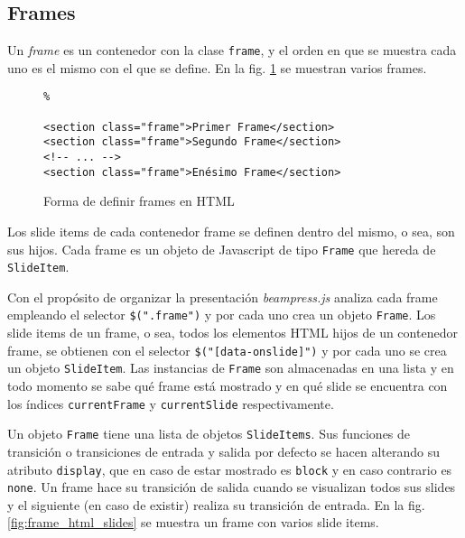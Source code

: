
		\subsection{Frames} %
		 \label{sub:frames}
		 
		  
			Un \textit{frame} es un contenedor con la clase \texttt{frame}, y el orden en que se muestra cada uno es el mismo con el que se define. En la fig. \ref{fig:frames_html} se muestran varios frames.


				\begin{figure}[htb]%
					\begin{lstlisting}%

<section class="frame">Primer Frame</section>
<section class="frame">Segundo Frame</section>
<!-- ... -->
<section class="frame">Enésimo Frame</section>
					\end{lstlisting}
					\caption{Forma de definir frames en HTML}
					\label{fig:frames_html}
				\end{figure}

			Los slide items de cada contenedor frame se definen dentro del mismo, o sea, son sus hijos. Cada frame es un objeto de Javascript de tipo \texttt{Frame} que hereda de \texttt{SlideItem}.

			Con el propósito de organizar la presentación \textit{beampress.js} analiza cada frame empleando el selector \texttt{\$(".frame")} y por cada uno crea un objeto \texttt{Frame}. Los slide items de un frame, o sea, todos los elementos HTML hijos de un contenedor frame, se obtienen con el selector \texttt{\$("[data-onslide]")} y por cada uno se crea un objeto \texttt{SlideItem}. Las instancias de \texttt{Frame} son almacenadas en una lista y en todo momento se sabe qué frame está mostrado y en qué slide se encuentra con los índices \texttt{currentFrame} y \texttt{currentSlide} respectivamente.

			Un objeto \texttt{Frame} tiene una lista de objetos \texttt{SlideItems}. Sus funciones de transición o transiciones de entrada y salida por defecto se hacen alterando su atributo \texttt{display}, que en caso de estar mostrado es \texttt{block} y en caso contrario es \texttt{none}. Un frame hace su transición de salida cuando se visualizan todos sus slides y el siguiente (en caso de existir) realiza su transición de entrada. En la fig. \ref{fig:frame_html_slides} se muestra un frame con varios slide items.

